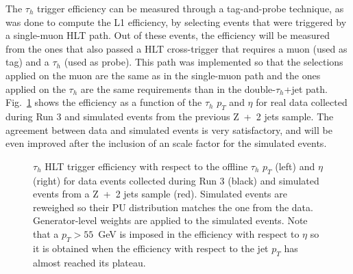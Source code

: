 \documentclass[../main.tex]{subfiles}
\begin{document}
The $\tau_h$ trigger efficiency can be measured through a tag-and-probe technique, as was done to compute the L1 efficiency, by selecting events that were triggered by a single-muon HLT path. Out of these events, the efficiency will be measured from the ones that also passed a HLT cross-trigger that requires a muon (used as tag) and a $\tau_h$ (used as probe). This path was implemented so that the selections applied on the muon are the same as in the single-muon path and the ones applied on the $\tau_h$ are the same requirements than in the double-$\tau_h$+jet path. Fig.~\ref{hh:fig:hlt_eff_tau} shows the efficiency as a function of the $\tau_h$ $p_T$ and $\eta$ for real data collected during Run 3 and simulated events from the previous Z~+~2 jets sample. The agreement between data and simulated events is very satisfactory, and will be even improved after the inclusion of an scale factor for the simulated events.

\begin{figure}[h!]
\begin{center}
\end{center}
\caption{$\tau_h$ HLT trigger efficiency with respect to the offline $\tau_h$ $p_T$ (left) and $\eta$ (right) for data events collected during Run 3 (black) and simulated events from a Z~+~2 jets sample (red). Simulated events are reweighed so their PU distribution matches the one from the data. Generator-level weights are applied to the simulated events. Note that a $p_T>55$~GeV is imposed in the efficiency with respect to $\eta$ so it is obtained when the efficiency with respect to the jet $p_T$ has almost reached its plateau.}
\label{hh:fig:hlt_eff_tau}
\end{figure}
\end{document}
